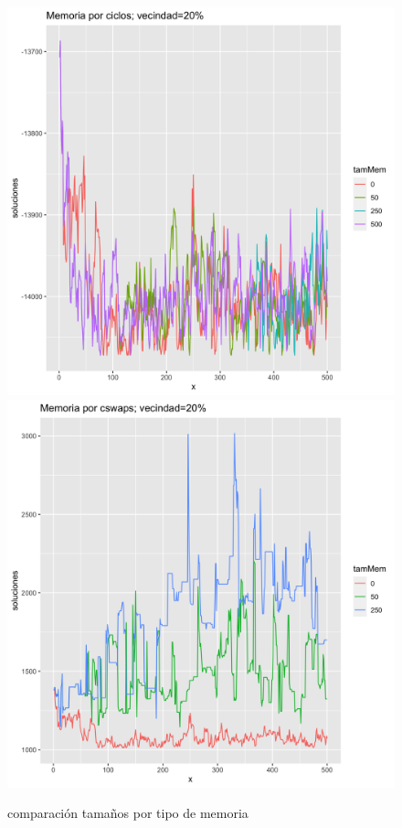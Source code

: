 \documentclass[10pt,a4paper]{article}
\begin{document}
\begin{figure} [H]
    \centering
    \includegraphics[scale=0.1]{img/grafico__memoria_ciclos_vecindad20.png}
    \includegraphics[scale=0.1]{img/grafico__memoria_swaps_vecindad20.png}
    \caption{comparación tamaños por tipo de memoria}
    \label{fig:tamMemo}
\end{figure}
\end{document}
